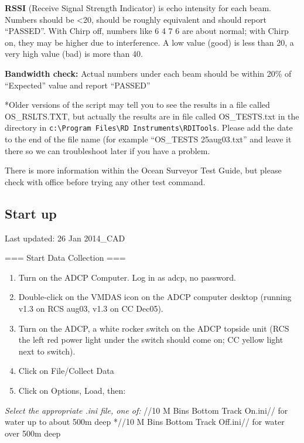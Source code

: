 \documentclass[]{book}
\theoremstyle{definition}
\theoremstyle{definition}
\theoremstyle{definition}
\theoremstyle{remark}
\begin{document}
\textbf{RSSI} (Receive Signal Strength Indicator) is echo intensity for
each beam. Numbers should be \textless{}20, should be roughly equivalent
and should report ``PASSED''. With Chirp off, numbers like 6 4 7 6 are
about normal; with Chirp on, they may be higher due to interference. A
low value (good) is less than 20, a very high value (bad) is more than
40.

\textbf{Bandwidth check:} Actual numbers under each beam should be
within 20\% of ``Expected'' value and report ``PASSED''

*Older versions of the script may tell you to see the results in a file
called OS\_RSLTS.TXT, but actually the results are in file called
OS\_TESTS.txt in the directory in
\texttt{c:\textbackslash{}Program\ Files\textbackslash{}RD\ Instruments\textbackslash{}RDITools}.
Please add the date to the end of the file name (for example ``OS\_TESTS
25aug03.txt'' and leave it there so we can troubleshoot later if you
have a problem.

There is more information within the Ocean Surveyor Test Guide, but
please check with office before trying any other test command.

\subsection{Start up}\label{start-up}

Last updated: 26 Jan 2014\_CAD

=== Start Data Collection ===

\begin{enumerate}
\def\labelenumi{\arabic{enumi}.}
\item
  Turn on the ADCP Computer. Log in as adcp, no password.
\item
  Double-click on the VMDAS icon on the ADCP computer desktop (running
  v1.3 on RCS aug03, v1.3 on CC Dec05).
\item
  Turn on the ADCP, a white rocker switch on the ADCP topside unit (RCS
  the left red power light under the switch should come on; CC yellow
  light next to switch).
\item
  Click on File/Collect Data
\item
  Click on Options, Load, then:
\end{enumerate}

\emph{Select the appropriate .ini file, one of: }//10 M Bins Bottom
Track On.ini// for water up to about 500m deep *//10 M Bins Bottom Track
Off.ini// for water over 500m deep
\end{document}
